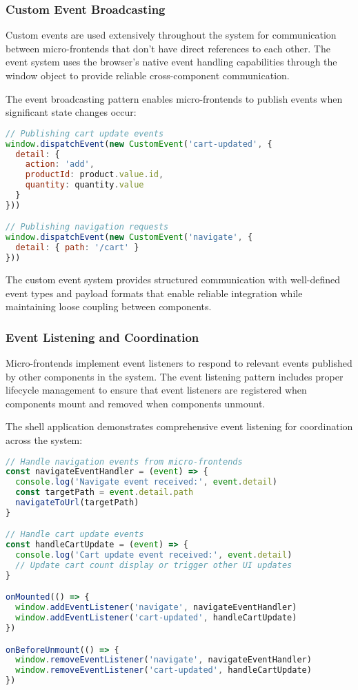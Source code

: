 \documentclass[12pt,a4paper]{report}
\begin{document}
\subsubsection{Custom Event Broadcasting}

Custom events are used extensively throughout the system for communication between micro-frontends that don't have direct references to each other. The event system uses the browser's native event handling capabilities through the window object to provide reliable cross-component communication.

The event broadcasting pattern enables micro-frontends to publish events when significant state changes occur:

\begin{lstlisting}[language=JavaScript, caption=Event Broadcasting Pattern]
// Publishing cart update events
window.dispatchEvent(new CustomEvent('cart-updated', { 
  detail: { 
    action: 'add', 
    productId: product.value.id,
    quantity: quantity.value
  }
}))

// Publishing navigation requests
window.dispatchEvent(new CustomEvent('navigate', { 
  detail: { path: '/cart' }
}))
\end{lstlisting}

The custom event system provides structured communication with well-defined event types and payload formats that enable reliable integration while maintaining loose coupling between components.

\subsubsection{Event Listening and Coordination}

Micro-frontends implement event listeners to respond to relevant events published by other components in the system. The event listening pattern includes proper lifecycle management to ensure that event listeners are registered when components mount and removed when components unmount.

The shell application demonstrates comprehensive event listening for coordination across the system:

\begin{lstlisting}[language=JavaScript, caption=Event Listening Implementation]
// Handle navigation events from micro-frontends
const navigateEventHandler = (event) => {
  console.log('Navigate event received:', event.detail)
  const targetPath = event.detail.path
  navigateToUrl(targetPath)
}

// Handle cart update events
const handleCartUpdate = (event) => {
  console.log('Cart update event received:', event.detail)
  // Update cart count display or trigger other UI updates
}

onMounted(() => {
  window.addEventListener('navigate', navigateEventHandler)
  window.addEventListener('cart-updated', handleCartUpdate)
})

onBeforeUnmount(() => {
  window.removeEventListener('navigate', navigateEventHandler)
  window.removeEventListener('cart-updated', handleCartUpdate)
})
\end{lstlisting}
\end{document}
